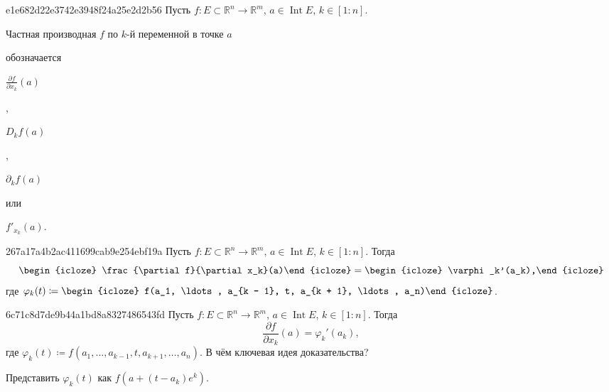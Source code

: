 \begin{note}{e1e682d22e3742e3948f24a25e2d2b56}
    Пусть \({ f : E \subset \mathbb R^{n} \to \mathbb R^{m} }\),\: \({ a \in \operatorname{Int} E }\),\: \({ k \in [1 : n] }\).
    \begin{icloze}{2}Частная производная \({ f }\) по \({ k }\)-й переменной в точке \({ a }\)\end{icloze} обозначается
    \begin{center}
        \begin{icloze}{1}\({ \frac{\partial f}{\partial x_k}(a) }\)\end{icloze},\: \begin{icloze}{1}\({ D_k f(a) }\)\end{icloze},\: \begin{icloze}{1}\({ \partial_k f(a) }\)\end{icloze} или \begin{icloze}{1}\({ f'_{x_k}(a) }\).\end{icloze}
    \end{center}
\end{note}

\begin{note}{267a17a4b2ac411699cab9e254ebf19a}
    Пусть \({ f : E \subset \mathbb R^{n} \to \mathbb R^{m} }\),\: \({ a \in \operatorname{Int} E }\),\: \({ k \in [1 : n] }\).
    Тогда
    \[
        \begin{icloze}{3}\frac{\partial f}{\partial x_k}(a)\end{icloze} = \begin{icloze}{2}\varphi_k'(a_k),\end{icloze}
    \]
    где \({ \varphi_k(t) \coloneqq \begin{icloze}{1}f(a_1, \ldots, a_{k - 1}, t, a_{k + 1}, \ldots, a_n)\end{icloze} }\).
\end{note}

\begin{note}{6c71c8d7de9b44a1bd8a8327486543fd}
    Пусть \({ f : E \subset \mathbb R^{n} \to \mathbb R^{m} }\),\: \({ a \in \operatorname{Int} E }\),\: \({ k \in [1 : n] }\).
    Тогда
    \[
        \frac{\partial f}{\partial x_k}(a) = \varphi_k'(a_k),
    \]
    где \({ \varphi_k(t) \coloneqq f(a_1, \ldots, a_{k - 1}, t, a_{k + 1}, \ldots, a_n) }\).
    В чём ключевая идея доказательства?

    \begin{cloze}{1}
        Представить \({ \varphi_k(t) }\) как \({ f(a + (t - a_k)e^{k}) }\).
    \end{cloze}
\end{note}

